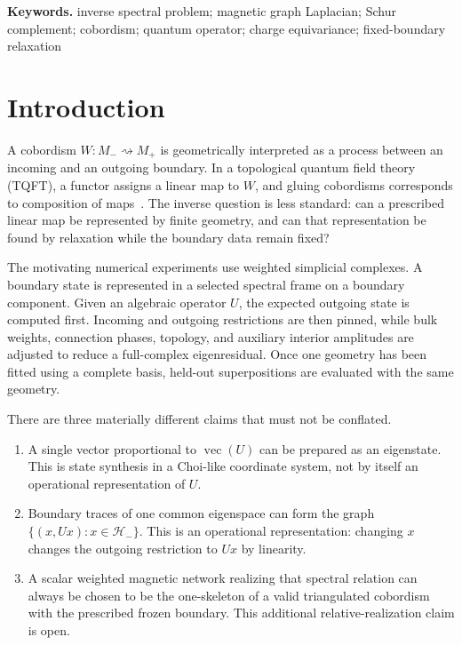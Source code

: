 \documentclass[11pt]{article}
\numberwithin{equation}{section}
\theoremstyle{definition}
\theoremstyle{remark}
\begin{document}
\noindent\textbf{Keywords.}
inverse spectral problem; magnetic graph Laplacian; Schur complement;
cobordism; quantum operator; charge equivariance; fixed-boundary relaxation

\section{Introduction}

A cobordism $W:M_-\rightsquigarrow M_+$ is geometrically interpreted as a
process between an incoming and an outgoing boundary.  In a topological quantum
field theory (TQFT), a functor assigns a linear map to $W$, and gluing
cobordisms corresponds to composition of maps~\cite{atiyah1988}.  The inverse
question is less standard: can a prescribed linear map be represented by
finite geometry, and can that representation be found by relaxation while the
boundary data remain fixed?

The motivating numerical experiments use weighted simplicial complexes.  A
boundary state is represented in a selected spectral frame on a boundary
component.  Given an algebraic operator $U$, the expected outgoing state is
computed first.  Incoming and outgoing restrictions are then pinned, while
bulk weights, connection phases, topology, and auxiliary interior amplitudes
are adjusted to reduce a full-complex eigenresidual.  Once one geometry has
been fitted using a complete basis, held-out superpositions are evaluated with
the same geometry.

There are three materially different claims that must not be conflated.

\begin{enumerate}[label=(\roman*)]
  \item A single vector proportional to $\operatorname{vec}(U)$ can be prepared
  as an eigenstate.  This is state synthesis in a Choi-like coordinate system,
  not by itself an operational representation of $U$.
  \item Boundary traces of one common eigenspace can form the graph
  $\{(x,Ux):x\in\mathcal H_-\}$.  This is an operational representation:
  changing $x$ changes the outgoing restriction to $Ux$ by linearity.
  \item A scalar weighted magnetic network realizing that spectral relation can
  always be chosen to be the one-skeleton of a valid triangulated cobordism with
  the prescribed frozen boundary.  This additional relative-realization claim
  is open.
\end{enumerate}
\end{document}
